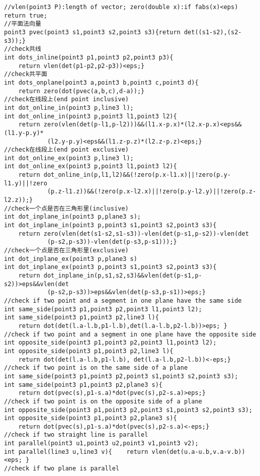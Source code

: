 \documentclass{article}
\begin{document}
\begin{lstlisting}
//vlen(point3 P):length of vector; zero(double x):if fabs(x)<eps) return true;
//平面法向量
point3 pvec(point3 s1,point3 s2,point3 s3){return det((s1-s2),(s2-s3));}
//check共线
int dots_inline(point3 p1,point3 p2,point3 p3){
    return vlen(det(p1-p2,p2-p3))<eps;}
//check共平面
int dots_onplane(point3 a,point3 b,point3 c,point3 d){
    return zero(dot(pvec(a,b,c),d-a));}
//check在线段上(end point inclusive)
int dot_online_in(point3 p,line3 l);
int dot_online_in(point3 p,point3 l1,point3 l2){
    return zero(vlen(det(p-l1,p-l2)))&&(l1.x-p.x)*(l2.x-p.x)<eps&&(l1.y-p.y)*
            (l2.y-p.y)<eps&&(l1.z-p.z)*(l2.z-p.z)<eps;}
//check在线段上(end point exclusive)
int dot_online_ex(point3 p,line3 l);
int dot_online_ex(point3 p,point3 l1,point3 l2){
    return dot_online_in(p,l1,l2)&&(!zero(p.x-l1.x)||!zero(p.y-l1.y)||!zero
            (p.z-l1.z))&&(!zero(p.x-l2.x)||!zero(p.y-l2.y)||!zero(p.z-l2.z));}
//check一个点是否在三角形里(inclusive)
int dot_inplane_in(point3 p,plane3 s);
int dot_inplane_in(point3 p,point3 s1,point3 s2,point3 s3){
    return zero(vlen(det(s1-s2,s1-s3))-vlen(det(p-s1,p-s2))-vlen(det
            (p-s2,p-s3))-vlen(det(p-s3,p-s1)));}
//check一个点是否在三角形里(exclusive)
int dot_inplane_ex(point3 p,plane3 s)
int dot_inplane_ex(point3 p,point3 s1,point3 s2,point3 s3){
    return dot_inplane_in(p,s1,s2,s3)&&vlen(det(p-s1,p-s2))>eps&&vlen(det
            (p-s2,p-s3))>eps&&vlen(det(p-s3,p-s1))>eps;}
//check if two point and a segment in one plane have the same side
int same_side(point3 p1,point3 p2,point3 l1,point3 l2);
int same_side(point3 p1,point3 p2,line3 l){
    return dot(det(l.a-l.b,p1-l.b),det(l.a-l.b,p2-l.b))>eps; }
//check if two point and a segment in one plane have the opposite side
int opposite_side(point3 p1,point3 p2,point3 l1,point3 l2);
int opposite_side(point3 p1,point3 p2,line3 l){
    return dot(det(l.a-l.b,p1-l.b), det(l.a-l.b,p2-l.b))<-eps;}
//check if two point is on the same side of a plane
int same_side(point3 p1,point3 p2,point3 s1,point3 s2,point3 s3);
int same_side(point3 p1,point3 p2,plane3 s){
    return dot(pvec(s),p1-s.a)*dot(pvec(s),p2-s.a)>eps;}
//check if two point is on the opposite side of a plane
int opposite_side(point3 p1,point3 p2,point3 s1,point3 s2,point3 s3);
int opposite_side(point3 p1,point3 p2,plane3 s){
    return dot(pvec(s),p1-s.a)*dot(pvec(s),p2-s.a)<-eps;}
//check if two straight line is parallel
int parallel(point3 u1,point3 u2,point3 v1,point3 v2);
int parallel(line3 u,line3 v){    return vlen(det(u.a-u.b,v.a-v.b))<eps; }
//check if two plane is parallel

\end{lstlisting}
\end{document}
